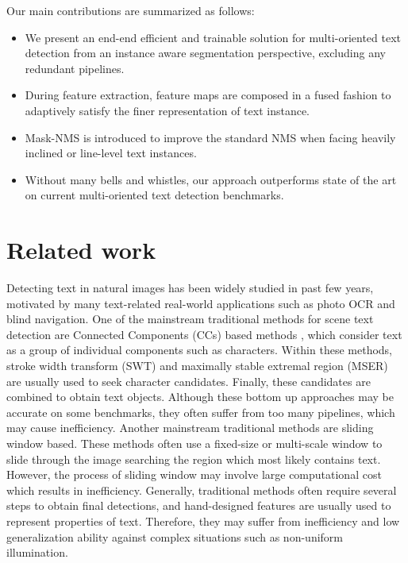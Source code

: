 \documentclass[a4paper,conference]{IEEEtran}
\begin{document}
Our main contributions are summarized as follows:
\begin{itemize}
\item We present an end-end efficient and  trainable solution for multi-oriented text detection from an instance aware segmentation perspective, excluding any redundant pipelines.
\item During feature extraction, feature maps are composed in a fused fashion to adaptively satisfy the finer representation of text instance.
\item Mask-NMS is introduced to improve the standard NMS when facing heavily inclined or line-level text instances.
\item Without many bells and whistles, our approach outperforms  state of the art on current multi-oriented text detection benchmarks.
\end{itemize}






\section{Related work}
Detecting text in natural images has been widely studied in past few years, motivated by many text-related real-world applications such as photo OCR and blind navigation. One of the mainstream traditional methods for scene text detection are Connected Components (CCs) based methods\cite{neumann2016real,wang2010word,Jaderberg2014Deep,huang2013text,neumann2010method}
 , which consider text as a group of individual components such as  characters. Within these methods, stroke width transform (SWT)\cite{epshtein2010detecting,huang2013text} and maximally stable extremal region (MSER)\cite{Matas2004Robust,neumann2010method,Neumann2012Real} are usually used to seek character candidates. Finally, these candidates are combined to obtain text objects. Although these bottom up approaches may be accurate on some benchmarks\cite{Shahab2011ICDAR,Karatzas2013ICDAR}, they often suffer from too many pipelines, which may cause inefficiency.  
Another mainstream traditional methods are sliding window based\cite{Chen2004Detecting,hanif2009text,Jaderberg2014Deep}. These methods often use a fixed-size or multi-scale window to slide through the image searching the region which most likely contains text.  However, the process of sliding window may involve large computational cost which results in inefficiency. Generally, traditional methods often require several steps to obtain final detections, and hand-designed features are usually used to represent properties of text. 
Therefore, they may suffer from inefficiency and low generalization ability against complex situations such as non-uniform illumination\cite{zhang2016character}.
\end{document}
